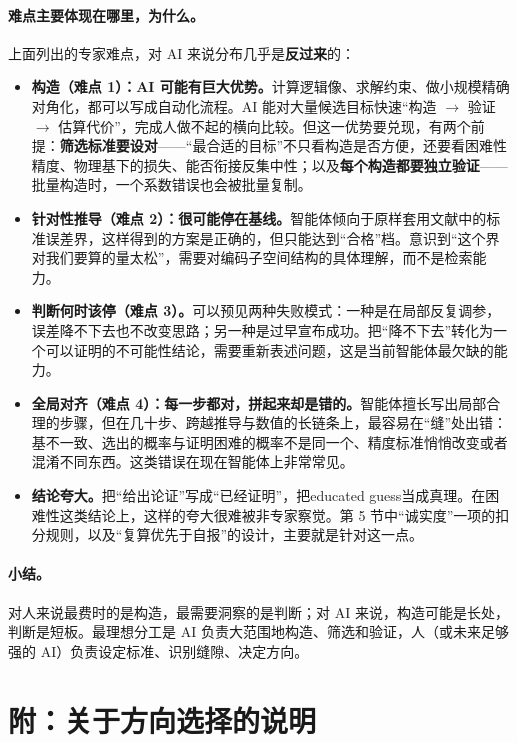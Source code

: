\documentclass[11pt,a4paper,fontset=none]{ctexart}
\begin{document}
\paragraph{难点主要体现在哪里，为什么。}上面列出的专家难点，对 AI 来说分布几乎是\textbf{反过来}的：

\begin{itemize}[itemsep=0.4em]
  \item \textbf{构造（难点 1）：AI 可能有巨大优势。}计算逻辑像、求解约束、做小规模精确对角化，都可以写成自动化流程。AI 能对大量候选目标快速“构造 $\to$ 验证 $\to$ 估算代价”，完成人做不起的横向比较。但这一优势要兑现，有两个前提：\textbf{筛选标准要设对}——“最合适的目标”不只看构造是否方便，还要看困难性精度、物理基下的损失、能否衔接反集中性；以及\textbf{每个构造都要独立验证}——批量构造时，一个系数错误也会被批量复制。
  \item \textbf{针对性推导（难点 2）：很可能停在基线。}智能体倾向于原样套用文献中的标准误差界，这样得到的方案是正确的，但只能达到“合格”档。意识到“这个界对我们要算的量太松”，需要对编码子空间结构的具体理解，而不是检索能力。
  \item \textbf{判断何时该停（难点 3）。}可以预见两种失败模式：一种是在局部反复调参，误差降不下去也不改变思路；另一种是过早宣布成功。把“降不下去”转化为一个可以证明的不可能性结论，需要重新表述问题，这是当前智能体最欠缺的能力。
  \item \textbf{全局对齐（难点 4）：每一步都对，拼起来却是错的。}智能体擅长写出局部合理的步骤，但在几十步、跨越推导与数值的长链条上，最容易在“缝”处出错：基不一致、选出的概率与证明困难的概率不是同一个、精度标准悄悄改变或者混淆不同东西。这类错误在现在智能体上非常常见。
  \item \textbf{结论夸大。}把“给出论证”写成“已经证明”，把educated guess当成真理。在困难性这类结论上，这样的夸大很难被非专家察觉。第 5 节中“诚实度”一项的扣分规则，以及“复算优先于自报”的设计，主要就是针对这一点。
\end{itemize}

\paragraph{小结。}对人来说最费时的是构造，最需要洞察的是判断；对 AI 来说，构造可能是长处，判断是短板。最理想分工是 AI 负责大范围地构造、筛选和验证，人（或未来足够强的 AI）负责设定标准、识别缝隙、决定方向。

\section*{附：关于方向选择的说明}
\end{document}
